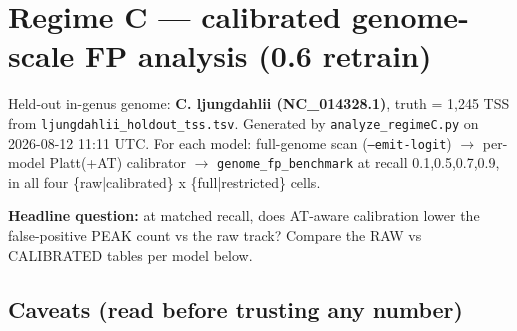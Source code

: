 \documentclass[10pt]{article}
\begin{document}
\section*{Regime C --- calibrated genome-scale FP analysis (0.6 retrain)}

Held-out in-genus genome: \textbf{C. ljungdahlii (NC\_014328.1)}, truth = 1,245 TSS from \texttt{ljungdahlii\_holdout\_tss.tsv}.
Generated by \texttt{analyze\_regimeC.py} on 2026-08-12 11:11 UTC.
For each model: full-genome scan (\texttt{--emit-logit}) $\to$ per-model Platt(+AT) calibrator $\to$ \texttt{genome\_fp\_benchmark} at recall 0.1,0.5,0.7,0.9, in all four \{raw|calibrated\} x \{full|restricted\} cells.

\textbf{Headline question:} at matched recall, does AT-aware calibration lower the false-positive PEAK count vs the raw track? Compare the RAW vs CALIBRATED tables per model below.


\subsection*{Caveats (read before trusting any number)}
\end{document}
